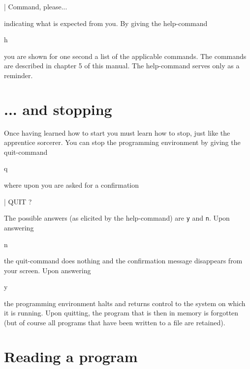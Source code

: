 \begin{elan}
|                               Command, please...
\end{elan}

\noindent
indicating what is expected from you. By giving the help-command

\begin{elan}
        h
\end{elan}

\noindent
you are shown for one second a list of the applicable commands.
The commands are described in chapter 5 of this manual. The help-command
serves only as a reminder.

\section{... and stopping}

Once having learned how to start you must learn how to stop,
just like the apprentice sorcerer.
You can stop the programming environment by giving the quit-command

\begin{elan}
        q
\end{elan}

\noindent
where upon you are asked for a confirmation

\begin{elan}
|       QUIT ?\cursor
\end{elan}

\noindent
The possible answers (as elicited by the help-command) are {\tt y} and {\tt n}. Upon answering

\begin{elan}
        n
\end{elan}

\noindent
the quit-command does nothing and the confirmation message disappears
from your screen. Upon answering

\begin{elan}
        y
\end{elan}

\noindent
the programming environment halts and returns control to the
system on which it is running.
Upon quitting, the program that is then in memory is forgotten
(but of course all programs that have been written to a file
are retained).

\section{Reading a program}

